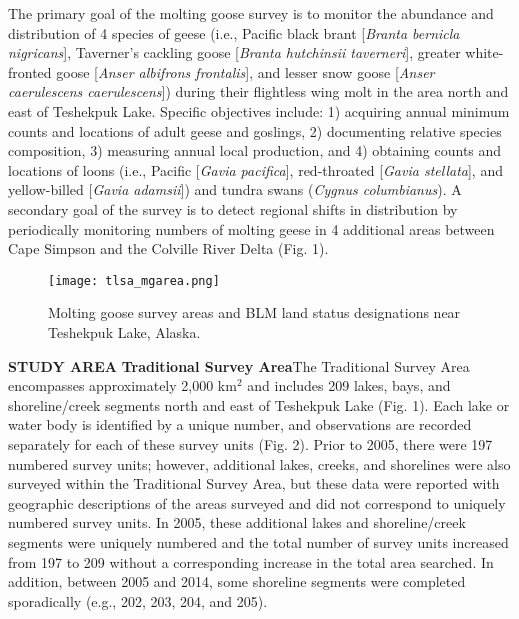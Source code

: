 \documentclass[
]{article}
\begin{document}
The primary goal of the molting goose survey is to monitor the abundance
and distribution of 4 species of geese (i.e., Pacific black brant
{[}\textit{Branta bernicla nigricans}{]}, Taverner's cackling goose
{[}\textit{Branta hutchinsii taverneri}{]}, greater white-fronted goose
{[}\textit{Anser albifrons frontalis}{]}, and lesser snow goose
{[}\textit{Anser caerulescens caerulescens}{]}) during their flightless
wing molt in the area north and east of Teshekpuk Lake. Specific
objectives include: 1) acquiring annual minimum counts and locations of
adult geese and goslings, 2) documenting relative species composition,
3) measuring annual local production, and 4) obtaining counts and
locations of loons (i.e., Pacific {[}\textit{Gavia pacifica}{]},
red-throated {[}\textit{Gavia stellata}{]}, and yellow-billed
{[}\textit{Gavia adamsii}{]}) and tundra swans
(\textit{Cygnus columbianus}). A secondary goal of the survey is to
detect regional shifts in distribution by periodically monitoring
numbers of molting geese in 4 additional areas between Cape Simpson and
the Colville River Delta (Fig. 1).

\begin{figure}[ht]
\texttt{[image: tlsa\_mgarea.png]}
\caption{Molting goose survey areas and BLM land status designations near Teshekpuk Lake, Alaska.}
\end{figure}

\textbf{STUDY AREA}\hfill\break
\textbf{Traditional Survey Area}\hfill\break The Traditional Survey Area
encompasses approximately 2,000 km\(^{2}\) and includes 209 lakes, bays,
and shoreline/creek segments north and east of Teshekpuk Lake (Fig. 1).
Each lake or water body is identified by a unique number, and
observations are recorded separately for each of these survey units
(Fig. 2). Prior to 2005, there were 197 numbered survey units; however,
additional lakes, creeks, and shorelines were also surveyed within the
Traditional Survey Area, but these data were reported with geographic
descriptions of the areas surveyed and did not correspond to uniquely
numbered survey units. In 2005, these additional lakes and
shoreline/creek segments were uniquely numbered and the total number of
survey units increased from 197 to 209 without a corresponding increase
in the total area searched. In addition, between 2005 and 2014, some
shoreline segments were completed sporadically (e.g., 202, 203, 204, and
205).
\end{document}
